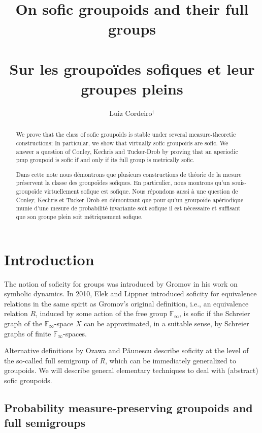 \documentclass[11pt]{amsart}
\title{On sofic groupoids and their full groups\\\ \\Sur les groupoïdes sofiques et leur groupes pleins}
\author{Luiz Cordeiro$\hspace{0pt}^\dagger$}
\theoremstyle{plain}    \newtheorem{theorem}[generalnumbering]{Theorem}
\theoremstyle{plain}    \newtheorem{corollary}[generalnumbering]{Corollary}
\theoremstyle{definition}   \newtheorem{definition}[generalnumbering]{Definition}
\theoremstyle{definition}   \newtheorem{example}[generalnumbering]{Example}
\theoremstyle{plain}    \newtheorem{proposition}[generalnumbering]{Proposition}
\theoremstyle{plain}    \newtheorem{lemma}[generalnumbering]{Lemma}
\theoremstyle{plain}    \newtheorem{plainstyle}[generalnumbering]{\namefordifferentenvironment}
\theoremstyle{plain}    \newtheorem*{plainstyle*}{\namefordifferentenvironment}
\theoremstyle{definition}    \newtheorem{definitionstyle}[generalnumbering]{\namefordifferentenvironment}
\theoremstyle{definition}    \newtheorem*{definitionstyle*}{\namefordifferentenvironment}
\begin{document}
\begin{abstract}
	We prove that the class of sofic groupoids is stable under several measure-theoretic constructions; In particular, we show that virtually sofic groupoids are sofic. We answer a question of Conley, Kechris and Tucker-Drob by proving that an aperiodic pmp groupoid is sofic if and only if its full group is metrically sofic.
\end{abstract}

\renewcommand{\abstractname}{Résumé}

\begin{abstract}
	Dans cette note nous démontrons que plusieurs constructions de théorie de la mesure préservent la classe des groupoïdes sofiques. En particulier, nous montrons qu'un souis-groupoïde virtuellement sofique est sofique. Nous répondons aussi à une question de Conley, Kechris et Tucker-Drob en démontrant que pour qu'un groupoïde apériodique munie d'une mesure de probabilité invariante soit sofique il est nécessaire et suffisant que son groupe plein soit métriquement sofique.
\end{abstract}

\maketitle

\section{Introduction}

The notion of soficity for groups was introduced by Gromov \cite{MR1694588} in his work on symbolic dynamics. In 2010, Elek and Lippner \cite{MR2566316} introduced soficity for equivalence relations in the same spirit as Gromov's original definition, i.e., an equivalence relation $R$, induced by some action of the free group $\mathbb{F}_\infty$, is sofic if the Schreier graph of the $\mathbb{F}_\infty$-space $X$ can be approximated, in a suitable sense, by Schreier graphs of finite $\mathbb{F}_\infty$-spaces.

Alternative definitions by Ozawa \cite{ozawasoficnotes} and P\v{a}unescu \cite{MR2826401} describe soficity at the level of the so-called full semigroup of $R$, which can be immediately generalized to groupoids. We will describe general elementary techniques to deal with (abstract) sofic groupoids.

\subsection{Probability measure-preserving groupoids and full semigroups}
\end{document}
